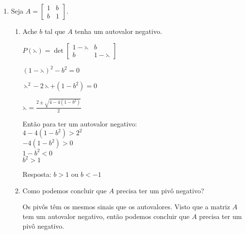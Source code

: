\documentclass[leqno]{article}
\numberwithin{equation}{section}
\begin{document}
	\date{\today}
	
	\maketitle
	
	\begin{enumerate}
		
		
		\item Seja $A = \begin{bmatrix}
			1 & b \\
			b & 1
		\end{bmatrix}$.
		
		\begin{enumerate}
			
			\item Ache $b$ tal que $A$ tenha um autovalor negativo.
			
			\begin{sol} 
				   $P(\leftthreetimes) = \det\begin{bmatrix}
				   	1 - \leftthreetimes & b \\
				   	b & 1 - \leftthreetimes
				   \end{bmatrix}$
			   
			$(1 - \leftthreetimes)^2 - b^2 = 0$
			
			$\leftthreetimes^2 - 2\leftthreetimes + (1 - b^2) = 0$ 
			
			$ \leftthreetimes = \frac{2 \pm \sqrt{4 - 4(1-b^2)}}{2}$
			
			Então para ter um autovalor negativo:\\
			$4 - 4(1-b^2) > 2^2$\\
			$-4(1-b^2) > 0$\\
			$1 - b^2 < 0$\\
			$b^2 > 1$
			
			Resposta:
			$b > 1$ ou $b < -1$
			\end{sol} 
			
			\item Como podemos concluir que $A$ precisa ter um pivô negativo?
			
			\begin{sol} 
				Os pivôs têm os mesmos sinais que os autovalores. Visto que a matriz $A$ tem um autovalor negativo, então podemos concluir que $A$ precisa ter um pivô negativo.
			\end{sol} 
			

\end{enumerate}
\end{enumerate}
\end{document}
